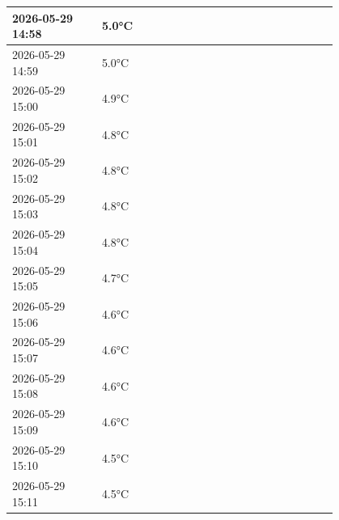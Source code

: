 \documentclass[UTF8,10pt,a4paper,fontset=fandol]{ctexart}
\newcommand{\fieldvalue}[1]{#1}
\begin{document}
\begin{center}
\begin{tabular}{|p{0.22\linewidth}|p{0.18\linewidth}|p{0.22\linewidth}|p{0.18\linewidth}|}
\fieldvalue{2026-05-29 14:58} &
\fieldvalue{5.0°C} & & \\
\hline
\fieldvalue{2026-05-29 14:59} &
\fieldvalue{5.0°C} & & \\
\hline
\fieldvalue{2026-05-29 15:00} &
\fieldvalue{4.9°C} & & \\
\hline
\fieldvalue{2026-05-29 15:01} &
\fieldvalue{4.8°C} & & \\
\hline
\fieldvalue{2026-05-29 15:02} &
\fieldvalue{4.8°C} & & \\
\hline
\fieldvalue{2026-05-29 15:03} &
\fieldvalue{4.8°C} & & \\
\hline
\fieldvalue{2026-05-29 15:04} &
\fieldvalue{4.8°C} & & \\
\hline
\fieldvalue{2026-05-29 15:05} &
\fieldvalue{4.7°C} & & \\
\hline
\fieldvalue{2026-05-29 15:06} &
\fieldvalue{4.6°C} & & \\
\hline
\fieldvalue{2026-05-29 15:07} &
\fieldvalue{4.6°C} & & \\
\hline
\fieldvalue{2026-05-29 15:08} &
\fieldvalue{4.6°C} & & \\
\hline
\fieldvalue{2026-05-29 15:09} &
\fieldvalue{4.6°C} & & \\
\hline
\fieldvalue{2026-05-29 15:10} &
\fieldvalue{4.5°C} & & \\
\hline
\fieldvalue{2026-05-29 15:11} &
\fieldvalue{4.5°C} & & \\
\hline
\end{tabular}
\end{center}
\end{document}
